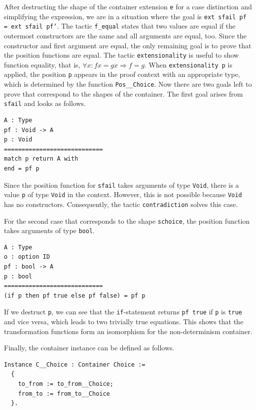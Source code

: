 \documentclass[a4paper, 11pt, fleqn, twoside, abstract=on]{scrreprt}
\newcommand{\hinl}[1]{\texttt{#1}}
\newcommand{\cinl}[1]{\texttt{#1}}
\begin{document}
After destructing the shape of the container extension \cinl{e} for a case distinction and simplifying the expression, we are in a situation where the goal is \cinl{ext sfail pf = ext sfail pf'}.
The tactic \cinl{f_equal} states that two values are equal if the outermost constructors are the same and all arguments are equal, too.
Since the constructor and first argument are equal, the only remaining goal is to prove that the position functions are equal.
The tactic \cinl{extensionality} is useful to show function equality, that is, $\forall x: f x = g x \Rightarrow f = g$.
When \cinl{extensionality p} is applied, the position \cinl{p} appears in the proof context with an appropriate type, which is determined by the function \cinl{Pos__Choice}.
Now there are two goals left to prove that correspond to the shapes of the container.
The first goal arises from \cinl{sfail} and looks as follows.

\begin{verbatim}
A : Type
pf : Void -> A
p : Void
============================
match p return A with
end = pf p
\end{verbatim}

Since the position function for \cinl{sfail} takes arguments of type \cinl{Void}, there is a value \cinl{p} of type \cinl{Void} in the context.
However, this is not possible because \cinl{Void} has no constructors.
Consequently, the tactic \cinl{contradiction} solves this case.

For the second case that corresponds to the shape \cinl{schoice}, the position function takes arguments of type \cinl{bool}.

\begin{verbatim}
A : Type
o : option ID
pf : bool -> A
p : bool
============================
(if p then pf true else pf false) = pf p
\end{verbatim}

If we destruct \hinl{p}, we can see that the \cinl{if}-statement returns \cinl{pf true} if \cinl{p} is \cinl{true} and vice versa, which leads to two trivially true equations.
This shows that the transformation functions form an isomorphism for the non-determinism container.

Finally, the container instance can be defined as follows.

\begin{verbatim}
Instance C__Choice : Container Choice :=
  {
    to_from := to_from__Choice;
    from_to := from_to__Choice
  }.
\end{verbatim}
\end{document}
